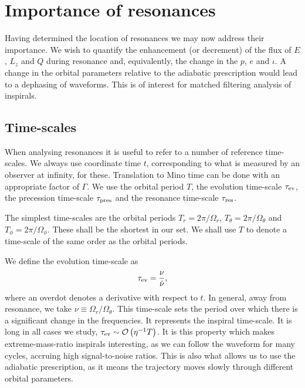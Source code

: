 \section{Importance of resonances}\label{sec:importance}

Having determined the location of resonances we may now address their importance. We wish to quantify the enhancement (or decrement) of the flux of $E$, $L_z$ and $Q$ during resonance and, equivalently, the change in the $p$, $e$ and $\iota$. A change in the orbital parameters relative to the adiabatic prescription would lead to a dephasing of waveforms. This is of interest for matched filtering analysis of inspirals.

\subsection{Time-scales}\label{sec:res-time}

When analysing resonances it is useful to refer to a number of reference time-scales. We always use coordinate time $t$, corresponding to what is measured by an observer at infinity, for these. Translation to Mino time can be done with an appropriate factor of $\Gamma$. We use the orbital period $T$, the evolution time-scale $\tau_\mathrm{ev}$, the precession time-scale $\tau_\mathrm{pres}$ and the resonance time-scale $\tau_\mathrm{res}$.

The simplest time-scales are the orbital periods $T_r = 2\pi/\Omega_r$, $T_\theta = 2\pi/\Omega_\theta$ and $T_\phi = 2\pi/\Omega_\phi$. These shall be the shortest in our set. We shall use $T$ to denote a time-scale of the same order as the orbital periods.

We define the evolution time-scale as
\begin{equation}
\tau_\mathrm{ev} = \dfrac{\nu}{\dot{\nu}},
\end{equation}
where an overdot denotes a derivative with respect to $t$. In general, away from resonance, we take $\nu \equiv \Omega_r/\Omega_\theta$. This time-scale sets the period over which there is a significant change in the frequencies. It represents the inspiral time-scale. It is long in all cases we study, $\tau_\mathrm{ev} \sim \mathcal{O}\left({\eta^{-1}T}\right)$. It is this property which makes extreme-mass-ratio inspirals interesting, as we can follow the waveform for many cycles, accruing high signal-to-noise ratios. This is also what allows us to use the adiabatic prescription, as it means the trajectory moves slowly through different orbital parameters.

